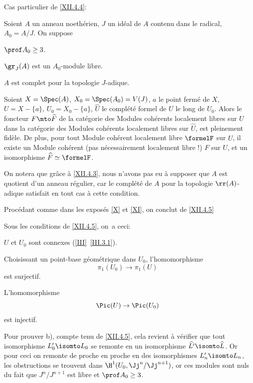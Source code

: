 \pagebreak[2]
Cas particulier de \ref{XII.4.4}:

\begin{corollaire} \label{XII.4.5}
Soient $A$ un anneau noeth\'erien, $J$ un id\'eal de $A$ contenu dans le radical, $A_0=A/J$. On suppose
\begin{enumeratei}
\item
$\prof A_0\geq 3$.
\item
$\gr_J(A)$ est un $A_0$-module libre.
\item
$A$ est complet pour la topologie $J$-adique.
\end{enumeratei}

Soient $X=\Spec(A)$, $X_0=\Spec(A_0)=V(J)$, $a$ le point ferm\'e de $X$, $U=X-\{a\}$, $U_0=X_0-\{a\}$, $\widehat{U}$ le compl\'et\'e formel de $U$ le long de $U_0$. Alors le foncteur $F\mto \widehat{F}$ de la cat\'egorie des Modules coh\'erents localement libres sur $U$ dans la cat\'egorie des Modules coh\'erents localement libres sur $\widehat{U}$, est pleinement fid\`ele. De plus, pour tout Module coh\'erent localement libre $\formelF$ sur $\widehat{U}$, il existe un Module coh\'erent (pas n\'ecessairement localement libre !) $F$ sur $U$, et un isomorphisme $\widehat{F}\simeq\formelF$.
\end{corollaire}

On notera que gr\^ace \`a \ref{XII.4.3}, nous n'avons pas eu \`a supposer que $A$ est quotient d'un anneau r\'egulier, car le compl\'et\'e de $A$ pour la topologie $\rr(A)$-adique satisfait en tout cas \`a cette condition.

Proc\'edant comme dans les expos\'es \ref{X} et \ref{XI}, on conclut de \ref{XII.4.5}

\begin{corollaire} \label{XII.4.6}
Sous les conditions de \ref{XII.4.5}, on~a ceci:
\begin{enumeratea}
\item
$U$ et $U_0$ sont connexes (\ref{III}~\ref{III.3.1}).

Choisissant un point-base g\'eom\'etrique dans $U_0$, l'homomorphisme
\[
\pi_1(U_0)\to \pi_1(U)
\]
est surjectif.
\item
L'homomorphisme
\[
\Pic(U)\to \Pic(U_0)
\]
est injectif.
\end{enumeratea}
\end{corollaire}

Pour prouver b), compte tenu de \ref{XII.4.5}, cela revient \`a v\'erifier que tout isomorphisme $L_0'\isomto L_0$ se remonte en un isomorphisme $\widehat{L'}\isomto \widehat{L}$. Or pour ceci on remonte de proche en proche en des isomorphismes $L_n'\isomto L_n$, les obstructions se trouvent dans $\H^1(U_0, \Jj^n/\Jj^{n+1})$, or ces modules sont nuls du fait que $J^n/J^{n+1}$ est libre et $\prof A_0\geq 3$.

